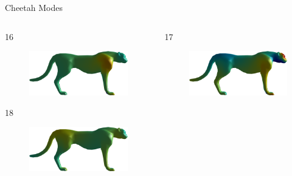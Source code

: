 \documentclass{beamer}
\begin{document}
\begin{frame}{Cheetah Modes}

\begin{columns}
\begin{column}[T]{5cm}
16
\begin{figure}[t]
    \includegraphics[width=\textwidth]{Harmonics/CheetahModes/16.png}
\end{figure}
18
\begin{figure}[t]
    \includegraphics[width=\textwidth]{Harmonics/CheetahModes/18.png}
\end{figure}
\end{column}
\begin{column}[T]{5cm}
17
\begin{figure}[t]
    \includegraphics[width=\textwidth]{Harmonics/CheetahModes/17.png}

\end{figure}
\end{column}
\end{columns}
\end{frame}
\end{document}
